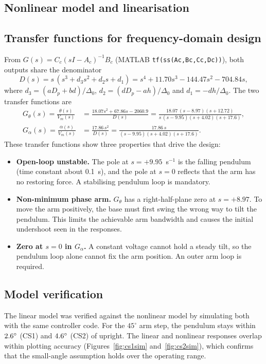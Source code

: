 \documentclass[11pt,a4paper]{article}
\begin{document}
\subsection{Nonlinear model and linearisation}


\subsection{Transfer functions for frequency-domain design}
From $G(s)=C_c(sI-A_c)^{-1}B_c$ (MATLAB \texttt{tf(ss(Ac,Bc,Cc,Dc))}),
both outputs share the denominator
\begin{equation}\label{eq:Dplant}
D(s)=s\,(s^3+d_3s^2+d_2s+d_1)=s^4+11.70s^3-144.47s^2-704.84s,
\end{equation}
where $d_3=(aD_p+bd)/\Delta_0$, $d_2=(dD_p-ah)/\Delta_0$ and
$d_1=-dh/\Delta_0$. The two transfer functions are
\begin{align}
G_\theta(s)=\frac{\theta(s)}{V_m(s)}&=
\frac{18.07s^2+67.86s-2060.9}{D(s)}
=\frac{18.07\,(s-8.97)(s+12.72)}{s\,(s-9.95)(s+4.02)(s+17.6)},\label{eq:Gth}\\
G_\alpha(s)=\frac{\alpha(s)}{V_m(s)}&=\frac{17.86\,s^2}{D(s)}
=\frac{17.86\,s}{(s-9.95)(s+4.02)(s+17.6)}.\label{eq:Gal}
\end{align}
These transfer functions show three properties that drive the design:
\begin{itemize}[nosep]
\item \textbf{Open-loop unstable.} The pole at $s=+9.95$~s$^{-1}$ is the
  falling pendulum (time constant about 0.1~s), and the pole at $s=0$
  reflects that the arm has no restoring force. A stabilising
  pendulum loop is mandatory.
\item \textbf{Non-minimum phase arm.} $G_\theta$ has a right-half-plane
  zero at $s=+8.97$. To move the arm positively, the base must first
  swing the wrong way to tilt the pendulum. This limits the achievable arm
  bandwidth and causes the initial undershoot seen in the responses.
\item \textbf{Zero at $s=0$ in $G_\alpha$.} A constant voltage cannot hold
  a steady tilt, so the pendulum loop alone cannot fix the arm position.
  An outer arm loop is required.
\end{itemize}

\subsection{Model verification}\label{sec:verify}
The linear model was verified against the nonlinear model by simulating
both with the same controller code. For the $45^\circ$ arm step, the
pendulum stays within $2.6^\circ$ (CS1) and $4.6^\circ$ (CS2) of
upright. The linear and nonlinear responses overlap within plotting
accuracy (Figures~\ref{fig:cs1sim} and~\ref{fig:cs2sim}), which confirms
that the small-angle assumption holds over the operating range.
\end{document}

